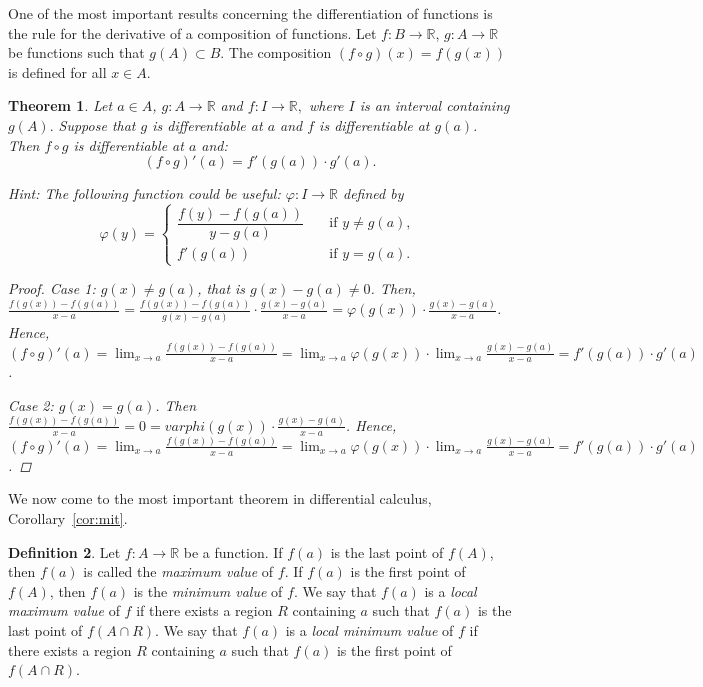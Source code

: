 \documentclass[11pt]{article}
\newcommand{\bbR}{\mathbb{R}}
\renewcommand{\phi}{\varphi}
\renewcommand{\_}[1]{\underline{ #1 }}
\newtheorem{theorem}{Theorem}[section]
\theoremstyle{definition}
\newtheorem{definition}[theorem]{Definition}
\numberwithin{equation}{subsection}
\begin{document}
One of the most important results concerning the differentiation of functions is the rule for the derivative of a composition of functions. Let $f\colon B \to \bbR$, $g\colon A \to \bbR$ be functions such that $g(A)\subset B$. The composition $(f \circ g)(x) = f(g(x))$ is defined for all $x \in A$. 



\begin{theorem}

	Let $a \in A$, $g\colon A\to\bbR$ and $f\colon I\to \bbR,$ where $I$ is an interval containing $g(A).$  Suppose that $g$ is differentiable at $a$ and $f$ is differentiable at $g(a)$.
	Then $f \circ g$ is differentiable at $a$ and:
	\[
		(f \circ g)'(a) = f'(g(a)) \cdot g'(a).
	\]


{\em Hint: The following function could be useful: $\phi\colon I\to\bbR$ defined by \[
		\phi(y) =
		\begin{cases}
			\dfrac{f(y) - f(g(a))}{y - g(a)} \quad &\text{if $y\neq g(a)$, } \\
			f'(g(a)) \quad &\text{if $y = g(a)$.} 
		\end{cases}
	\] }



\begin{proof}
Case 1: $g(x)\neq g(a)$, that is $g(x)-g(a)\neq 0$. Then, $\frac{f(g(x))-f(g(a))}{x-a}=\frac{f(g(x))-f(g(a))}{g(x)-g(a)}\cdot \frac{g(x)-g(a)}{x-a}=\varphi(g(x))\cdot \frac{g(x)-g(a)}{x-a}$. Hence, $(f\circ g)'(a)= \lim_{x\to a} \frac{f(g(x))-f(g(a))}{x-a} = \lim_{x\to a} \varphi(g(x))\cdot \lim_{x\to a}\frac{g(x)-g(a)}{x-a} = f'(g(a))\cdot g'(a)$.

Case 2: $g(x)=g(a)$. Then $\frac{f(g(x))-f(g(a))}{x-a}=0=varphi(g(x))\cdot \frac{g(x)-g(a)}{x-a}$. Hence, $(f\circ g)'(a)= \lim_{x\to a}\frac{f(g(x))-f(g(a))}{x-a}=\lim_{x\to a}\varphi(g(x))\cdot \lim_{x\to a} \frac{g(x)-g(a)}{x-a}=f'(g(a))\cdot g'(a)$.



\renewcommand\qedsymbol{QED}
\end{proof}

\end{theorem}

We now come to the most important theorem in differential calculus, Corollary~\ref{cor:mit}.

\begin{definition}
	Let $f\colon A \to \bbR$ be a function. If $f(a)$ is the last point of $f(A)$, then $f(a)$ is called the \emph{maximum value} of $f$. If $f(a)$ is the first point of $f(A)$, then $f(a)$ is the \emph{minimum value} of $f$. We say that $f(a)$ is a \emph{local maximum value} of $f$ if there exists a region $R$ containing $a$ such that $f(a)$ is the last point of $f(A \cap R)$. We say that $f(a)$ is a \emph{local minimum value} of $f$ if there exists a region $R$ containing $a$ such that $f(a)$ is the first point of $f(A \cap R)$.
\end{definition}
\end{document}
